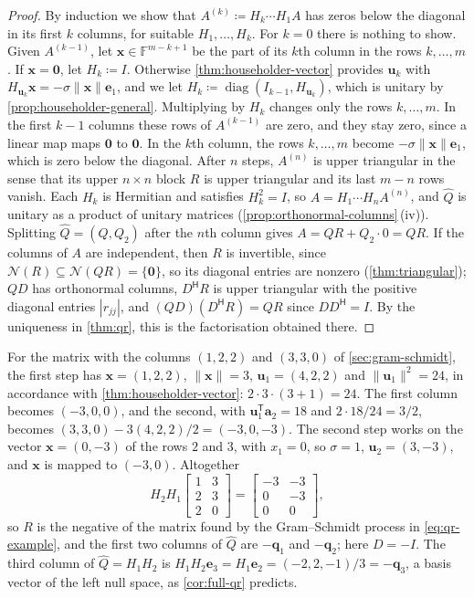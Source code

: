 \begin{proof}
By induction we show that $A^{(k)}\coloneqq H_k\cdots H_1A$ has zeros below the diagonal in its first $k$ columns, for suitable $H_1,\ldots,H_k$. For $k=0$ there is nothing to show. Given $A^{(k-1)}$, let $\mathbf x\in\mathbb F^{m-k+1}$ be the part of its $k$th column in the rows $k,\ldots,m$. If $\mathbf x=\mathbf 0$, let $H_k\coloneqq I$. Otherwise \cref{thm:householder-vector} provides $\mathbf u_k$ with $H_{\mathbf u_k}\mathbf x=-\sigma\|\mathbf x\|\mathbf e_1$, and we let $H_k\coloneqq\operatorname{diag}(I_{k-1},H_{\mathbf u_k})$, which is unitary by \cref{prop:householder-general}. Multiplying by $H_k$ changes only the rows $k,\ldots,m$. In the first $k-1$ columns these rows of $A^{(k-1)}$ are zero, and they stay zero, since a linear map maps $\mathbf 0$ to $\mathbf 0$. In the $k$th column, the rows $k,\ldots,m$ become $-\sigma\|\mathbf x\|\mathbf e_1$, which is zero below the diagonal. After $n$ steps, $A^{(n)}$ is upper triangular in the sense that its upper $n\times n$ block $R$ is upper triangular and its last $m-n$ rows vanish. Each $H_k$ is Hermitian and satisfies $H_k^2=I$, so $A=H_1\cdots H_nA^{(n)}$, and $\hat Q$ is unitary as a product of unitary matrices (\cref{prop:orthonormal-columns}\,(iv)). Splitting $\hat Q=(Q,Q_2)$ after the $n$th column gives $A=QR+Q_2\cdot0=QR$. If the columns of $A$ are independent, then $R$ is invertible, since $\mathcal N(R)\subseteq\mathcal N(QR)=\{\mathbf 0\}$, so its diagonal entries are nonzero (\cref{thm:triangular}); $QD$ has orthonormal columns, $D^{\mathsf H}R$ is upper triangular with the positive diagonal entries $|r_{jj}|$, and $(QD)(D^{\mathsf H}R)=QR$ since $DD^{\mathsf H}=I$. By the uniqueness in \cref{thm:qr}, this is the factorisation obtained there.
\end{proof}

For the matrix with the columns $(1,2,2)$ and $(3,3,0)$ of \cref{sec:gram-schmidt}, the first step has $\mathbf x=(1,2,2)$, $\|\mathbf x\|=3$, $\mathbf u_1=(4,2,2)$ and $\|\mathbf u_1\|^2=24$, in accordance with \cref{thm:householder-vector}: $2\cdot3\cdot(3+1)=24$. The first column becomes $(-3,0,0)$, and the second, with $\mathbf u_1^{\mathsf T}\mathbf a_2=18$ and $2\cdot18/24=3/2$, becomes $(3,3,0)-3(4,2,2)/2=(-3,0,-3)$. The second step works on the vector $\mathbf x=(0,-3)$ of the rows $2$ and $3$, with $x_1=0$, so $\sigma=1$, $\mathbf u_2=(3,-3)$, and $\mathbf x$ is mapped to $(-3,0)$. Altogether
\[
H_2H_1\begin{bmatrix}1&3\\2&3\\2&0\end{bmatrix}=\begin{bmatrix}-3&-3\\0&-3\\0&0\end{bmatrix},
\]
so $R$ is the negative of the matrix found by the Gram--Schmidt process in \eqref{eq:qr-example}, and the first two columns of $\hat Q$ are $-\mathbf q_1$ and $-\mathbf q_2$; here $D=-I$. The third column of $\hat Q=H_1H_2$ is $H_1H_2\mathbf e_3=H_1\mathbf e_2=(-2,2,-1)/3=-\mathbf q_3$, a basis vector of the left null space, as \cref{cor:full-qr} predicts.

